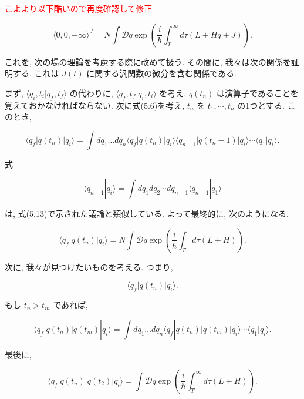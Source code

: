 \documentclass[a4paper,12pt]{article}
\begin{document}
\textcolor{red}{こよより以下酷いので再度確認して修正\\}

\begin{equation*}
\langle 0, 0, -\infty \rangle^J = N \int \mathcal{D}q \exp \left( \frac{i}{\hbar} \int_T^\infty d\tau \left( L + H q + J \right) \right).
\end{equation*}

これを, 次の場の理論を考慮する際に改めて扱う. その間に, 我々は次の関係を証明する. これは \( J(t) \) に関する汎関数の微分を含む関係である.


まず, \( \langle q_i, t_i | q_f, t_f \rangle \) の代わりに, \( \langle q_f, t_f | q_i, t_i \rangle \) を考え, \( q(t_n) \) は演算子であることを覚えておかなければならない. 次に式(5.6)を考え, \( t_n \) を \( t_1, \cdots, t_n \) の1つとする. このとき,

\begin{equation*}
\langle q_f | q(t_n) | q_i \rangle = \int dq_1 \dots dq_n \langle q_f | q(t_n) | q_i \rangle \langle q_{n-1} | q(t_n-1) | q_i \rangle \cdots \langle q_1 | q_i \rangle.
\end{equation*}

式

\begin{equation*}
\langle q_{n-1} | q_i \rangle = \int dq_1 dq_2 \cdots dq_{n-1} \langle q_{n-1} | q_1 \rangle
\end{equation*}

は, 式(5.13)で示された議論と類似している. よって最終的に, 次のようになる.

\begin{equation*}
\langle q_f | q(t_n) | q_i \rangle = N \int \mathcal{D}q \exp \left( \frac{i}{\hbar} \int_{T} d\tau (L + H) \right). \tag{5.69}
\end{equation*}

次に, 我々が見つけたいものを考える. つまり,

\begin{equation*}
\langle q_f | q(t_n) | q_i \rangle.
\end{equation*}

もし \( t_n > t_m \) であれば,

\begin{equation*}
\langle q_f | q(t_n) | q(t_m) | q_i \rangle = \int dq_1 \dots dq_n \langle q_f | q(t_n) | q(t_m) | q_i \rangle \cdots \langle q_1 | q_i \rangle.
\end{equation*}

最後に,

\begin{equation*}
\langle q_f | q(t_n) | q(t_2) | q_i \rangle = \int \mathcal{D}q \exp \left( \frac{i}{\hbar} \int_T^\infty d\tau (L + H) \right). \tag{5.70}
\end{equation*}
\end{document}
